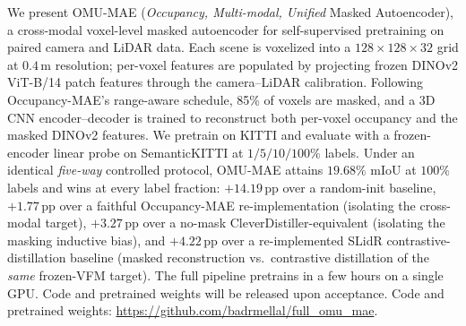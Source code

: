 We present OMU-MAE (\emph{Occupancy, Multi-modal, Unified} Masked
Autoencoder), a cross-modal voxel-level masked autoencoder for
self-supervised pretraining on paired camera and LiDAR data. Each scene
is voxelized into a $128\times128\times32$ grid at $0.4$\,m resolution;
per-voxel features are populated by projecting frozen DINOv2 ViT-B/14
patch features through the camera--LiDAR calibration. Following
Occupancy-MAE's range-aware schedule, 85\% of voxels are masked, and a
3D CNN encoder--decoder is trained to reconstruct both per-voxel
occupancy and the masked DINOv2 features. We pretrain on KITTI and
evaluate with a frozen-encoder linear probe on SemanticKITTI at
$1/5/10/100\%$ labels. Under an identical \emph{five-way} controlled
protocol, OMU-MAE attains $19.68\%$ mIoU at $100\%$ labels and wins at
every label fraction: $+14.19$\,pp over a random-init baseline,
$+1.77$\,pp over a faithful Occupancy-MAE re-implementation (isolating
the cross-modal target), $+3.27$\,pp over a no-mask
CleverDistiller-equivalent (isolating the masking inductive bias), and
$+4.22$\,pp over a re-implemented SLidR contrastive-distillation
baseline (masked reconstruction vs.\ contrastive distillation of the
\emph{same} frozen-VFM target). The full
pipeline pretrains in a few hours on a single GPU.
\ifanon
Code and pretrained weights will be released upon acceptance.
\else
Code and pretrained weights: \url{https://github.com/badrmellal/full_omu_mae}.
\fi

